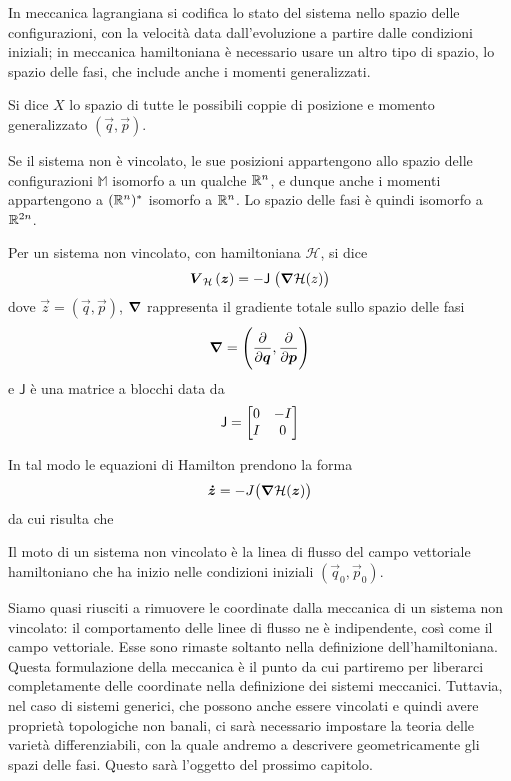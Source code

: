 In meccanica lagrangiana si codifica lo stato del sistema nello spazio delle configurazioni, con la velocità data dall'evoluzione a partire dalle condizioni iniziali; in meccanica hamiltoniana è necessario usare un altro tipo di spazio, lo spazio delle fasi, che include anche i momenti generalizzati.
\begin{definition}
  Si dice  $X$ lo spazio di tutte le possibili coppie di posizione e momento generalizzato $(\vec{q},\vec{p})$.
\end{definition}
\begin{remark}
  Se il sistema non è vincolato, le sue posizioni appartengono allo spazio delle configurazioni $\mathbb{M}$ isomorfo a un qualche $\mathbb{R}^{n}$, e dunque anche i momenti appartengono a $(\mathbb{R}^{n})^*$ isomorfo a $\mathbb{R}^{n}$. Lo spazio delle fasi è quindi isomorfo a $\mathbb{R}^{2n}$.
\end{remark}

\begin{definition}
  Per un sistema non vincolato, con hamiltoniana $\mathcal{H}$, si dice  \begin{equation}
    \boldsymbol{V}_{\mathcal{H}}\,(\boldsymbol{z}) = -\mathsf{J}\; \big(\grad{\mathcal{H}} (z)\big)
  \end{equation}
  dove $\vec{z}=(\vec{q},\vec{p})$, $\grad$ rappresenta il gradiente totale sullo spazio delle fasi \begin{equation}
    \grad = \Bigg(\pdv{\boldsymbol{q}},\pdv{\boldsymbol{p}}\Bigg) 
    \end{equation}
    e $\mathsf{J}$ è una matrice a blocchi data da \begin{equation}
    \mathsf{J} = \bmqty{0 & -I \\ I & 0}
    \end{equation}
\end{definition}

In tal modo le equazioni di Hamilton prendono la forma \begin{equation}
\boldsymbol{\dot{z}} = -J \big(\grad{\mathcal{H}} (\boldsymbol{z})\big)
\end{equation} 
da cui risulta che
\begin{theorem}
  Il moto di un sistema non vincolato è la linea di flusso del campo vettoriale hamiltoniano che ha inizio nelle condizioni iniziali $(\vec{q}_0, \vec{p}_0)$.
\end{theorem} 

Siamo quasi riusciti a rimuovere le coordinate dalla meccanica di un sistema non vincolato: il comportamento delle linee di flusso ne è indipendente, così come il campo vettoriale. Esse sono rimaste soltanto nella definizione dell'hamiltoniana. Questa formulazione della meccanica è il punto da cui partiremo per liberarci completamente delle coordinate nella definizione dei sistemi meccanici. Tuttavia, nel caso di sistemi generici, che possono anche essere vincolati e quindi avere proprietà topologiche non banali, ci sarà necessario impostare la teoria delle varietà differenziabili, con la quale andremo a descrivere geometricamente gli spazi delle fasi. Questo sarà l'oggetto del prossimo capitolo.